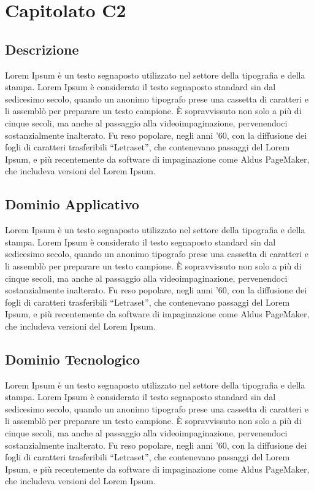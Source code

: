 \section{Capitolato C2}
\subsection{Descrizione}
Lorem Ipsum è un testo segnaposto utilizzato nel settore della tipografia e della stampa. Lorem Ipsum è considerato il testo segnaposto standard sin dal sedicesimo secolo, quando un anonimo tipografo prese una cassetta di caratteri e li assemblò per preparare un testo campione. È sopravvissuto non solo a più di cinque secoli, ma anche al passaggio alla videoimpaginazione, pervenendoci sostanzialmente inalterato. Fu reso popolare, negli anni ’60, con la diffusione dei fogli di caratteri trasferibili “Letraset”, che contenevano passaggi del Lorem Ipsum, e più recentemente da software di impaginazione come Aldus PageMaker, che includeva versioni del Lorem Ipsum.

\subsection{Dominio Applicativo}
Lorem Ipsum è un testo segnaposto utilizzato nel settore della tipografia e della stampa. Lorem Ipsum è considerato il testo segnaposto standard sin dal sedicesimo secolo, quando un anonimo tipografo prese una cassetta di caratteri e li assemblò per preparare un testo campione. È sopravvissuto non solo a più di cinque secoli, ma anche al passaggio alla videoimpaginazione, pervenendoci sostanzialmente inalterato. Fu reso popolare, negli anni ’60, con la diffusione dei fogli di caratteri trasferibili “Letraset”, che contenevano passaggi del Lorem Ipsum, e più recentemente da software di impaginazione come Aldus PageMaker, che includeva versioni del Lorem Ipsum.

\subsection{Dominio Tecnologico}
Lorem Ipsum è un testo segnaposto utilizzato nel settore della tipografia e della stampa. Lorem Ipsum è considerato il testo segnaposto standard sin dal sedicesimo secolo, quando un anonimo tipografo prese una cassetta di caratteri e li assemblò per preparare un testo campione. È sopravvissuto non solo a più di cinque secoli, ma anche al passaggio alla videoimpaginazione, pervenendoci sostanzialmente inalterato. Fu reso popolare, negli anni ’60, con la diffusione dei fogli di caratteri trasferibili “Letraset”, che contenevano passaggi del Lorem Ipsum, e più recentemente da software di impaginazione come Aldus PageMaker, che includeva versioni del Lorem Ipsum.

